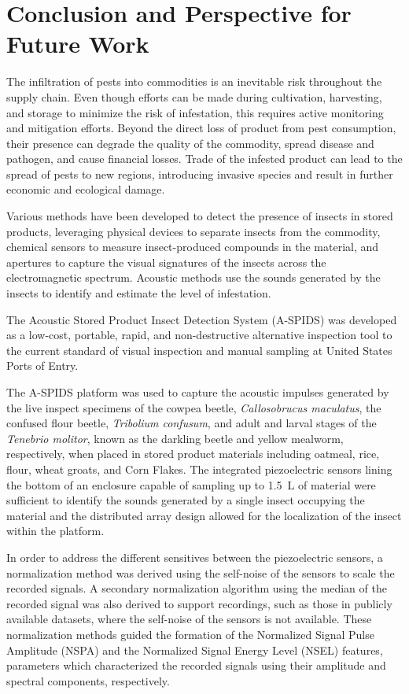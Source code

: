 \documentclass[../Vibro-Acoustic Signatures and Detection Algorithms for Stored Product Insects.tex]{subfiles}
\begin{document}
\chapter{Conclusion and Perspective for Future Work} \label{conc}

The infiltration of pests into commodities is an inevitable risk throughout the supply chain. Even though efforts can be made during cultivation, harvesting, and storage to minimize the risk of infestation, this requires active monitoring and mitigation efforts. Beyond the direct loss of product from pest consumption, their presence can degrade the quality of the commodity, spread disease and pathogen, and cause financial losses. Trade of the infested product can lead to the spread of pests to new regions, introducing invasive species and result in further economic and ecological damage. 

Various methods have been developed to detect the presence of insects in stored products, leveraging physical devices to separate insects from the commodity, chemical sensors to measure insect-produced compounds in the material, and apertures to capture the visual signatures of the insects across the electromagnetic spectrum. Acoustic methods use the sounds generated by the insects to identify and estimate the level of infestation. 

The Acoustic Stored Product Insect Detection System (A-SPIDS) was developed as a low-cost, portable, rapid, and non-destructive alternative inspection tool to the current standard of visual inspection and manual sampling at United States Ports of Entry. 

The A-SPIDS platform was used to capture the acoustic impulses generated by the live inspect specimens of the cowpea beetle, \textit{Callosobrucus maculatus}, the confused flour beetle, \textit{Tribolium confusum}, and adult and larval stages of the \textit{Tenebrio molitor}, known as the darkling beetle and yellow mealworm, respectively, when placed in stored product materials including oatmeal, rice, flour, wheat groats, and Corn Flakes. The integrated piezoelectric sensors lining the bottom of an enclosure capable of sampling up to \SI{1.5}{\liter} of material were sufficient to identify the sounds generated by a single insect occupying the material and the distributed array design allowed for the localization of the insect within the platform.

In order to address the different sensitives between the piezoelectric sensors, a normalization method was derived using the self-noise of the sensors to scale the recorded signals. A secondary normalization algorithm using the median of the recorded signal was also derived to support recordings, such as those in publicly available datasets, where the self-noise of the sensors is not available. These normalization methods guided the  formation of the Normalized Signal Pulse Amplitude (NSPA) and the Normalized Signal Energy Level (NSEL) features, parameters which characterized the recorded signals using their amplitude and spectral components, respectively. 
\end{document}
